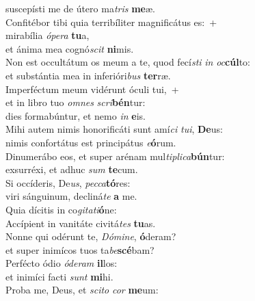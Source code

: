 \evenverse suscepísti me de útero ma\textit{tris} \textbf{me}æ.\\
\oddverse Confitébor tibi quia terribíliter magnificátus es:~+\\
\oddverse  mirabília \textit{ó}\textit{pe}\textit{ra} \textbf{tu}a,~\*\\
\oddverse et ánima mea cognó\textit{scit} \textbf{ni}mis.\\
\evenverse Non est occultátum os meum a te, quod fecí\textit{sti} \textit{in} \textit{oc}\textbf{cúl}to:~\*\\
\evenverse et substántia mea in inferióri\textit{bus} \textbf{ter}ræ.\\
\oddverse Imperféctum meum vidérunt óculi tui,~+\\
\oddverse  et in libro tuo \textit{om}\textit{nes} \textit{scri}\textbf{bén}tur:~\*\\
\oddverse dies formabúntur, et nemo \textit{in} \textbf{e}is.\\
\evenverse Mihi autem nimis honorificáti sunt amí\textit{ci} \textit{tu}\textit{i}, \textbf{De}us:~\*\\
\evenverse nimis confortátus est principátus \textit{e}\textbf{ó}rum.\\
\oddverse Dinumerábo eos, et super arénam mul\textit{ti}\textit{pli}\textit{ca}\textbf{bún}tur:~\*\\
\oddverse exsurréxi, et adhuc \textit{sum} \textbf{te}cum.\\
\evenverse Si occíderis, De\textit{us}, \textit{pec}\textit{ca}\textbf{tó}res:~\*\\
\evenverse viri sánguinum, decliná\textit{te} \textbf{a} me.\\
\oddverse Quia dícitis in co\textit{gi}\textit{ta}\textit{ti}\textbf{ó}ne:~\*\\
\oddverse Accípient in vanitáte civitá\textit{tes} \textbf{tu}as.\\
\evenverse Nonne qui odérunt te, \textit{Dó}\textit{mi}\textit{ne}, \textbf{ó}deram?~\*\\
\evenverse et super inimícos tuos ta\textit{be}\textbf{scé}bam?\\
\oddverse Perfécto ódio \textit{ó}\textit{de}\textit{ram} \textbf{il}los:~\*\\
\oddverse et inimíci facti \textit{sunt} \textbf{mi}hi.\\
\evenverse Proba me, Deus, et \textit{sci}\textit{to} \textit{cor} \textbf{me}um:~\*\\
